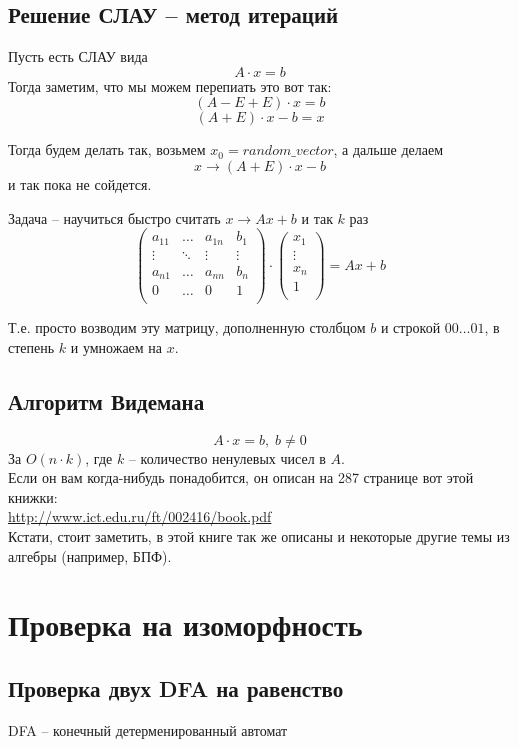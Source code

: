 \subsection{Решение СЛАУ -- метод итераций}

Пусть есть СЛАУ вида
$$A \cdot x = b$$
Тогда заметим, что мы можем перепиать это вот так:
$$(A - E + E) \cdot x = b$$
$$(A + E) \cdot x - b = x$$

Тогда будем делать так, возьмем $x_0 = random\_vector$, а дальше делаем
$$x \rightarrow (A + E) \cdot x - b$$
и так пока не сойдется.

Задача -- научиться быстро считать $x \rightarrow Ax + b$ и так $k$ раз\\
$$
\begin{pmatrix}
a_{11} & \dots  & a_{1n} & b_1\\
\vdots & \ddots & \vdots & \vdots\\
a_{n1} & \dots  & a_{nn}  & b_n\\
0 & \dots & 0 & 1\\
\end{pmatrix}
\cdot
\begin{pmatrix}
x_1\\
\vdots\\
x_n\\
1\\
\end{pmatrix}
=
Ax + b
$$

Т.е. просто возводим эту матрицу, дополненную столбцом $b$ и строкой $00\dots01$, в степень $k$ и умножаем на $x$.

\subsection{Алгоритм Видемана}
$$A \cdot x = b,\; b \neq 0$$
За $O(n \cdot k)$, где $k$ -- количество ненулевых чисел в $A$.\\
Если он вам когда-нибудь понадобится, он описан на 287 странице вот этой книжки:\\ 
\href{http://www.ict.edu.ru/ft/002416/book.pdf}{http://www.ict.edu.ru/ft/002416/book.pdf}\\
Кстати, стоит заметить, в этой книге так же описаны и некоторые другие темы из алгебры (например, БПФ).

\section{Проверка на изоморфность}
\subsection{Проверка двух DFA на равенство}
DFA -- конечный детерменированный автомат\\

